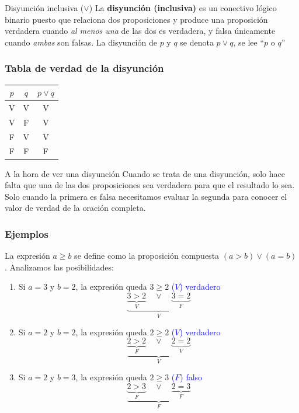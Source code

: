 \begin{dfn}{Disyunción inclusiva ($\vee$)}
    La \textbf{disyunción (inclusiva)} es un conectivo lógico binario puesto que relaciona dos proposiciones y produce una proposición verdadera cuando \emph{al menos una} de las dos es verdadera, y falsa únicamente cuando \emph{ambas} son falsas. La disyunción de $p$ y $q$ se denota $p \lor q$, se lee ``$p$ o $q$''
\end{dfn}

\subsubsection*{Tabla de verdad de la disyunción}
\begin{center}
    \renewcommand{\arraystretch}{1.4}
    \begin{tabular}{|c|c|c|}
        \hline
        \textbf{$p$} & \textbf{$q$} & \textbf{$p \lor q$} \\
        \hline
        V & V & V \\
        \hline
        V & F & V \\
        \hline
        F & V & V \\
        \hline
        F & F & F \\
        \hline
    \end{tabular}
\end{center}

\begin{obs}{A la hora de ver una disyunción}
    Cuando se trata de una disyunción, solo hace falta que una de las dos proposiciones sea verdadera para que el resultado lo sea. Solo cuando la primera es falsa necesitamos evaluar la segunda para conocer el valor de verdad de la oración completa.
\end{obs}

\subsubsection*{Ejemplos}

La expresión $a \geq b$ se define como la proposición compuesta $(a>b) \lor (a=b)$. Analizamos las posibilidades:

\begin{enumerate}[label=\alph*)]
    \item Si $a = 3$ y $b = 2$, la expresión queda $3 \geq 2$ \textcolor{blue}{($V$) verdadero}
    \[
    \underbrace{
        \underbrace{3 > 2}_{V}
        \quad \lor \quad
        \underbrace{3 = 2}_{F}
    }_{V}
    \]

    \item Si $a = 2$ y $b = 2$, la expresión queda $2 \geq 2$ \textcolor{blue}{($V$) verdadero}
    \[
    \underbrace{
        \underbrace{2 > 2}_{F}
        \quad \lor \quad
        \underbrace{2 = 2}_{V}
    }_{V}
    \]

    \item Si $a = 2$ y $b = 3$, la expresión queda $2 \geq 3$ \textcolor{blue}{($F$) falso}
    \[
    \underbrace{
        \underbrace{2 > 3}_{F}
        \quad \lor \quad
        \underbrace{2 = 3}_{F}
    }_{F}
    \]
\end{enumerate}

